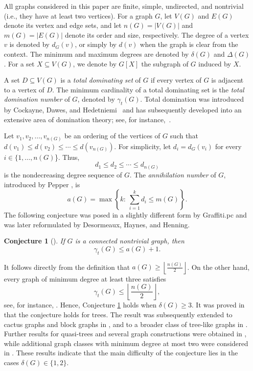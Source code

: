 \documentclass[12pt]{article}
\newtheorem{conjecture}{Conjecture}
\begin{document}
All graphs considered in this paper are finite, simple, undirected, and nontrivial (i.e., they have at least two vertices). For a graph $G$, let $V(G)$ and $E(G)$ denote its vertex and edge sets, and let $n(G)=|V(G)|$ and $m(G)=|E(G)|$ denote its order and size, respectively. The degree of a vertex $v$ is denoted by $d_G(v)$, or simply by $d(v)$ when the graph is clear from the context. The minimum and maximum degrees are denoted by $\delta(G)$ and $\Delta(G)$. For a set $X\subseteq V(G)$, we denote by $G[X]$ the subgraph of $G$ induced by $X$.

A set $D\subseteq V(G)$ is a \emph{total dominating set} of $G$ if every vertex of $G$ is adjacent to a vertex of $D$. The minimum cardinality of a total dominating set is the \emph{total domination number} of $G$, denoted by $\gamma_t(G)$. Total domination was introduced by Cockayne, Dawes, and Hedetniemi~\cite{CockayneDawesHedetniemi1980} and has subsequently developed into an extensive area of domination theory; see, for instance,~\cite{HenningYeoBook}.

Let $v_1,v_2,\ldots,v_{n(G)}$ be an ordering of the vertices of $G$ such that $d(v_1)\le d(v_2)\le\cdots\le d(v_{n(G)})$. For simplicity, let $d_i=d_G(v_i)$ for every $i \in \{1,\ldots,n(G)$\}. Thus,
$$d_1\le d_2\le\cdots\le d_{n(G)}$$
is the nondecreasing degree sequence of $G$. The \emph{annihilation number} of $G$, introduced by Pepper \cite{Pepper2004,Pepper2009}, is
$$a(G)=\max\left\{k :\ \sum_{i=1}^{k}d_i\le m(G)\right\}.$$
The following conjecture was posed in a slightly different form by Graffiti.pc and was later reformulated by Desormeaux, Haynes, and Henning.

\begin{conjecture}[\cite{DesormeauxHaynesHenning2013}]\label{conj:main}
If $G$ is a connected nontrivial graph, then
$$\gamma_t(G)\le a(G)+1.$$
\end{conjecture}

It follows directly from the definition that $a(G)\ge \left\lfloor\frac{n(G)}{2}\right\rfloor$. On the other hand, every graph of minimum degree at least three satisfies
$$\gamma_t(G)\le \left\lfloor\frac{n(G)}2\right\rfloor,$$
see, for instance, \cite{ArchdeaconEtAl2004}. Hence, Conjecture \ref{conj:main} holds when $\delta(G)\ge3$. It was proved in \cite{DesormeauxHaynesHenning2013} that the conjecture holds for trees. The result was subsequently extended to cactus graphs and block graphs in \cite{BujtasJakovac2019}, and to a broader class of tree-like graphs in \cite{YueZhuWei2020}. Further results for quasi-trees and several graph constructions were obtained in \cite{HuaHuaKlavzarXu2022}, while additional graph classes with minimum degree at most two were considered in \cite{HuaXuHua2023}. These results indicate that the main difficulty of the conjecture lies in the cases $\delta(G)\in\{1,2\}$.
\end{document}
